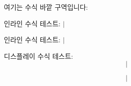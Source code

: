 \documentclass{article}
\begin{document}

여기는 수식 바깥 구역입니다: 



인라인 수식 테스트: $|$

인라인 수식 테스트: $|$


디스플레이 수식 테스트:
$$
  |
$$


$$
  |
$$
\end{document}
